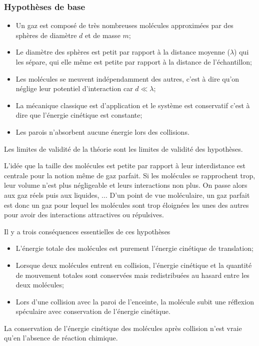 \subsubsection{Hypothèses de base}
\begin{itemize}
  \item Un gaz est composé de très nombreuses molécules approximées
    par des sphères de diamètre $d$ et de masse $m$;
  \item Le diamètre des sphères est petit par rapport
    à la distance moyenne ($\lambda$) qui les sépare, qui elle même est petite
    par rapport à la distance de l'échantillon;
  \item Les molécules se meuvent indépendamment des autres,
    c'est à dire qu'on néglige leur potentiel d'interaction car $d \ll \lambda$;
  \item La mécanique classique est d'application et le système est conservatif
    c'est à dire que l'énergie cinétique est constante;
  \item Les parois n'absorbent aucune énergie lors des collisions.
\end{itemize}
Les limites de validité de la théorie sont
les limites de validité des hypothèses.

L'idée que la taille des molécules est petite par rapport à leur interdistance
est centrale pour la notion même de gaz parfait.
Si les molécules se rapprochent trop,
leur volume n'est plus négligeable et leurs interactions non plus.
On passe alors aux gaz réels puis aux liquides, ...
D'un point de vue moléculaire,
un gaz parfait est donc un gaz pour lequel les molécules sont
trop éloignées les unes des autres pour avoir des interactions attractives ou
répulsives.

Il y a trois conséquences essentielles de ces hypothèses
\begin{itemize}
  \item L'énergie totale des molécules est purement
    l'énergie cinétique de translation;
  \item Lorsque deux molécules entrent en collision,
    l'énergie cinétique et la quantité de mouvement totales sont
    conservées mais redistribuées au hasard entre les deux molécules;
  \item Lors d'une collision avec la paroi de l'enceinte,
    la molécule subit une réflexion spéculaire avec conservation
    de l'énergie cinétique.
\end{itemize}
La conservation de l'énergie cinétique des molécules après collision
n'est vraie qu'en l'absence de réaction chimique.

